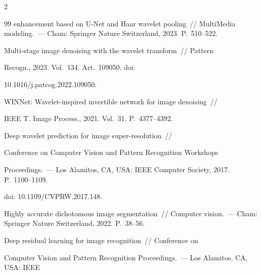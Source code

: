 \begin{multicols}{2}
{{\begin{thebibliography}{99}
enhancement based on U-Net and Haar wavelet pooling~//  MultiMedia modeling.~--- Cham: Springer Nature Switzerland, 2023. P.~510--522.


 






    Multi-stage image denoising with the wavelet transform~// Pattern


    Recogn., 2023. Vol.~134. Art.~109050. doi: 


10.1016/j.patcog.2022.109050.


  




     WINNet: Wavelet-inspired     invertible network for image denoising~//


     IEEE T.  Image Process., 2021. Vol.~31. P.~4377--4392.


    




      Deep wavelet prediction for image super-resolution~// 


 Conference on Computer Vision and Pattern Recognition Workshops 


Proceedings.~--- Los Alamitos, CA, USA: IEEE Computer Society, 2017. P.~1100--1109. 


doi: 10.1109/CVPRW.2017.148.


    






    Highly accurate dichotomous image segmentation~// Computer vision.~--- Cham: Springer Nature Switzerland, 2022. P.~38--56.


    






    Deep residual learning for image recognition~// Conference on 


Computer Vision and Pattern Recognition Proceedings.~--- Los Alamitos, CA, USA: IEEE 



\end{thebibliography}}}
\end{multicols}
